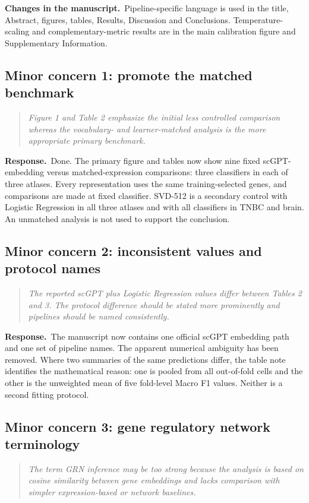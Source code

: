 \documentclass[11pt,a4paper]{article}
\newcommand{\commenttext}[1]{\begin{quote}\itshape #1\end{quote}}
\newcommand{\responsehead}{\par\noindent\textbf{Response.}\ }
\newcommand{\changehead}{\par\noindent\textbf{Changes in the manuscript.}\ }
\begin{document}
\changehead Pipeline-specific language is used in the title, Abstract, figures, tables, Results, Discussion and Conclusions. Temperature-scaling and complementary-metric results are in the main calibration figure and Supplementary Information.

\subsection*{Minor concern 1: promote the matched benchmark}

\commenttext{Figure 1 and Table 2 emphasize the initial less controlled comparison whereas the vocabulary- and learner-matched analysis is the more appropriate primary benchmark.}

\responsehead Done. The primary figure and tables now show nine fixed scGPT-embedding versus matched-expression comparisons: three classifiers in each of three atlases. Every representation uses the same training-selected genes, and comparisons are made at fixed classifier. SVD-512 is a secondary control with Logistic Regression in all three atlases and with all classifiers in TNBC and brain. An unmatched analysis is not used to support the conclusion.

\subsection*{Minor concern 2: inconsistent values and protocol names}

\commenttext{The reported scGPT plus Logistic Regression values differ between Tables 2 and 3. The protocol difference should be stated more prominently and pipelines should be named consistently.}

\responsehead The manuscript now contains one official scGPT embedding path and one set of pipeline names. The apparent numerical ambiguity has been removed. Where two summaries of the same predictions differ, the table note identifies the mathematical reason: one is pooled from all out-of-fold cells and the other is the unweighted mean of five fold-level Macro F1 values. Neither is a second fitting protocol.

\subsection*{Minor concern 3: gene regulatory network terminology}

\commenttext{The term GRN inference may be too strong because the analysis is based on cosine similarity between gene embeddings and lacks comparison with simpler expression-based or network baselines.}
\end{document}
